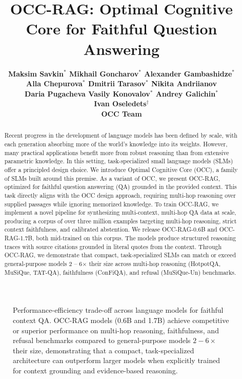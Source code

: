 \documentclass{article}
\title{OCC-RAG: Optimal Cognitive Core for Faithful Question Answering}
\author{\bf Maksim Savkin$^*$ \qquad Mikhail Goncharov$^*$ \qquad Alexander Gambashidze$^*$   \\
    \bf Alla Chepurova$^*$ \qquad Dmitrii Tarasov$^*$ \qquad Nikita Andriianov \\
    \bf Daria Pugacheva \qquad Vasily Konovalov$^*$ \qquad Andrey Galichin$^*$ \\
    \bf  Ivan Oseledets$^{\dagger}$\\[0.4cm]
    {\normalsize OCC Team}
}
\begin{document}
\maketitle
{}

\begin{abstract}
Recent progress in the development of language models has been defined by scale, with each generation absorbing more of the world's knowledge into its weights. However, many practical applications benefit more from robust reasoning than from extensive parametric knowledge. In this setting, task-specialized small language models (SLMs) offer a principled design choice. We introduce Optimal Cognitive Core (OCC), a family of SLMs built around this premise. As a variant of OCC, we present OCC-RAG, optimized for faithful question answering (QA) grounded in the provided context. This task directly aligns with the OCC design approach, requiring multi-hop reasoning over supplied passages while ignoring memorized knowledge. To train OCC-RAG, we implement a novel pipeline for synthesizing multi-context, multi-hop QA data at scale, producing a corpus of over three million examples targeting multi-hop reasoning, strict context faithfulness, and calibrated abstention. We release OCC-RAG-0.6B and OCC-RAG-1.7B, both mid-trained on this corpus. The models produce structured reasoning traces with source citations grounded in literal quotes from the context. Through OCC-RAG, we demonstrate that compact, task-specialized SLMs can match or exceed general-purpose models 2 -- 6$\times$ their size across multi-hop reasoning (HotpotQA, MuSiQue, TAT-QA), faithfulness (ConFiQA), and refusal (MuSiQue-Un) benchmarks.
\end{abstract}

\begin{figure}[ht!]
    \centering
    
    \caption{Performance-efficiency trade-off across language models for faithful context QA. OCC-RAG models (0.6B and 1.7B) achieve competitive or superior performance on multi-hop reasoning, faithfulness, and refusal benchmarks compared to general-purpose models $2-6\times$ their size, demonstrating that a compact, task-specialized architecture can outperform larger models when explicitly trained for context grounding and evidence-based reasoning.}
    \label{fig:main}
\end{figure}
\end{document}
